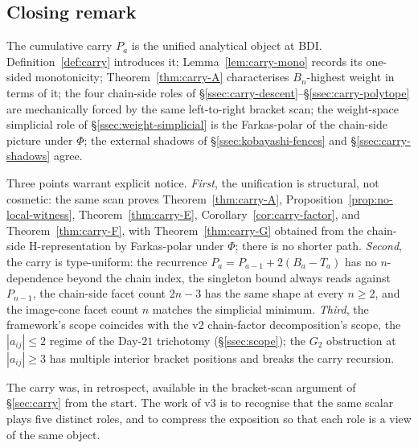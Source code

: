 \subsection{Closing remark}\label{ssec:carry-closing}

The cumulative carry $P_a$ is the unified analytical object at BDI.
Definition~\ref{def:carry} introduces it; Lemma~\ref{lem:carry-mono} records its
one-sided monotonicity; Theorem~\ref{thm:carry-A} characterises $B_n$-highest
weight in terms of it; the four chain-side roles of
\S\ref{ssec:carry-descent}--\S\ref{ssec:carry-polytope} are mechanically forced
by the same left-to-right bracket scan; the weight-space simplicial role of
\S\ref{ssec:weight-simplicial} is the Farkas-polar of the chain-side picture
under $\Phi$; the external shadows of \S\ref{ssec:kobayashi-fences} and
\S\ref{ssec:carry-shadows} agree.

Three points warrant explicit notice. \emph{First}, the unification is
structural, not cosmetic: the same scan proves
Theorem~\ref{thm:carry-A}, Proposition~\ref{prop:no-local-witness},
Theorem~\ref{thm:carry-E}, Corollary~\ref{cor:carry-factor}, and
Theorem~\ref{thm:carry-F}, with Theorem~\ref{thm:carry-G} obtained from the
chain-side H-representation by Farkas-polar under $\Phi$; there is no shorter
path. \emph{Second}, the carry is type-uniform: the recurrence $P_a = P_{a-1}
+ 2(B_a - T_a)$ has no $n$-dependence beyond the chain index, the singleton
bound always reads against $P_{n-1}$, the chain-side facet count $2n - 3$ has
the same shape at every $n \ge 2$, and the image-cone facet count $n$ matches
the simplicial minimum. \emph{Third}, the framework's scope coincides with the
v2 chain-factor decomposition's scope, the $|a_{ij}| \le 2$ regime of the
Day-$21$ trichotomy (\S\ref{ssec:scope}); the $G_2$ obstruction at $|a_{ij}|
\ge 3$ has multiple interior bracket positions and breaks the carry recursion.

The carry was, in retrospect, available in the bracket-scan argument of
\S\ref{sec:carry} from the start. The work of v3 is to recognise that the same
scalar plays five distinct roles, and to compress the exposition so that each
role is a view of the same object.

%
%
